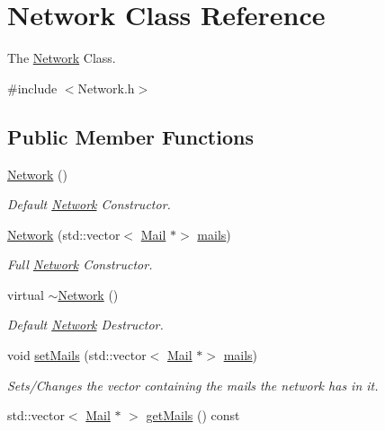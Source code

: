 \hypertarget{classNetwork}{}\section{Network Class Reference}
\label{classNetwork}


The \hyperlink{classNetwork}{Network} Class.  




{\ttfamily \#include $<$Network.\+h$>$}

\subsection*{Public Member Functions}
\begin{DoxyCompactItemize}
\item 
\hyperlink{classNetwork_a3cc2fb4f8fa4d507077e8da85ce5a1c8}{Network} ()
\begin{DoxyCompactList}\small\item\em Default \hyperlink{classNetwork}{Network} Constructor. \end{DoxyCompactList}\item 
\hyperlink{classNetwork_a6c20a000b0a40b33b39b26874a4d50dd}{Network} (std\+::vector$<$ \hyperlink{classMail}{Mail} $\ast$$>$ \hyperlink{classNetwork_a7d870918668129e7853c5374785955b1}{mails})
\begin{DoxyCompactList}\small\item\em Full \hyperlink{classNetwork}{Network} Constructor. \end{DoxyCompactList}\item 
virtual \hyperlink{classNetwork_a7a4e19cdb4bf0c7ecf82baa643831492}{$\sim$\+Network} ()
\begin{DoxyCompactList}\small\item\em Default \hyperlink{classNetwork}{Network} Destructor. \end{DoxyCompactList}\item 
void \hyperlink{classNetwork_a2dfe751f83ea0ed37835baf23770d1b6}{set\+Mails} (std\+::vector$<$ \hyperlink{classMail}{Mail} $\ast$$>$ \hyperlink{classNetwork_a7d870918668129e7853c5374785955b1}{mails})
\begin{DoxyCompactList}\small\item\em Sets/\+Changes the vector containing the mails the network has in it. \end{DoxyCompactList}\item 
std\+::vector$<$ \hyperlink{classMail}{Mail} $\ast$ $>$ \hyperlink{classNetwork_acd375ea0a8fb7558f15a432ce6354d93}{get\+Mails} () const

\end{DoxyCompactItemize}
